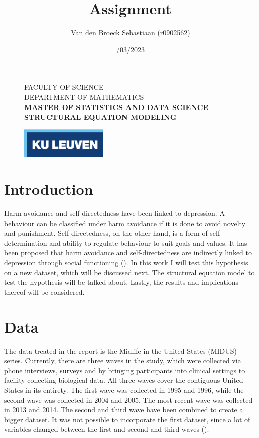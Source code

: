 \documentclass[11pt]{article}
\title{\vspace*{40.0mm}
  \bf\sf Assignment
         \vspace*{20.0mm} \\
  \vspace*{40.0mm}}
\author{\sf Van den Broeck Sebastiaan (r0902562)}
\date{\sf 13/03/2023}
\begin{document}
\begin{figure}
  \parbox[t]{125mm}{
    \vspace*{6mm}
    \scriptsize\sf           FACULTY OF SCIENCE \\
    \scriptsize\sf           DEPARTMENT OF MATHEMATICS \\
    \scriptsize\sf\bfseries  MASTER OF STATISTICS AND DATA SCIENCE \\
    \scriptsize\sf\bfseries  STRUCTURAL EQUATION MODELING \\}
  \parbox[t]{40mm}{
    \begin{flushright}
      \includegraphics[height=15mm]{logo.eps.pdf}
    \end{flushright}}
\end{figure}

\maketitle
\thispagestyle{empty}
\raggedbottom

\cleardoublepage
\setcounter{page}{1}
\setcounter{tocdepth}{3}

\section{Introduction}

Harm avoidance and self-directedness have been linked to depression.
A behaviour can be classified under harm avoidance if it is done to avoid novelty and punishment.
Self-directedness, on the other hand, is a form of self-determination and ability to regulate behaviour to suit goals and values.
It has been proposed that harm avoidance and self-directedness are indirectly linked to depression through social functioning (\cite{tse2011}).
In this work I will test this hypothesis on a new dataset, which will be discussed next.
The structural equation model to test the hypothesis will be talked about.
Lastly, the results and implications thereof will be considered.

\section{Data}

The data treated in the report is the Midlife in the United States (MIDUS) series.
Currently, there are three waves in the study, which were collected via phone interviews, surveys and by bringing participants into clinical settings to facility collecting biological data.
All three waves cover the contiguous United States in its entirety.
The first wave was collected in 1995 and 1996, while the second wave was collected in 2004 and 2005.
The most recent wave was collected in 2013 and 2014.
The second and third wave have been combined to create a bigger dataset.
It was not possible to incorporate the first dataset, since a lot of variables changed between the first and second and third waves (\cite{radler2014}).
\end{document}
